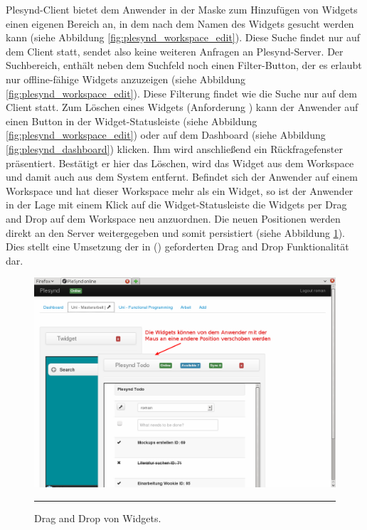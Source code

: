 Plesynd-Client bietet dem Anwender in der Maske zum Hinzufügen von Widgets einen eigenen Bereich an, in dem nach dem Namen des Widgets gesucht werden kann (siehe Abbildung \ref{fig:plesynd_workspace_edit}). Diese Suche findet nur auf dem Client statt, sendet also keine weiteren Anfragen an Plesynd-Server. Der Suchbereich, enthält neben dem Suchfeld noch einen Filter-Button, der es erlaubt nur offline-fähige Widgets anzuzeigen (siehe Abbildung \ref{fig:plesynd_workspace_edit}). Diese Filterung findet wie die Suche nur auf dem Client statt. Zum Löschen eines Widgets (Anforderung  \emph{\requirementWidgetDelete}) kann der Anwender auf einen Button in der Widget-Statusleiste (siehe Abbildung \ref{fig:plesynd_workspace_edit}) oder auf dem Dashboard (siehe Abbildung \ref{fig:plesynd_dashboard}) klicken. Ihm wird anschließend ein Rückfragefenster präsentiert. Bestätigt er hier das Löschen, wird das Widget aus dem Workspace und damit auch aus dem System entfernt. Befindet sich der Anwender auf einem Workspace und hat dieser Workspace mehr als ein Widget, so ist der Anwender in der Lage mit einem Klick auf die Widget-Statusleiste die Widgets per Drag and Drop auf dem Workspace neu anzuordnen. Die neuen Positionen werden direkt an den Server weitergegeben und somit persistiert (siehe Abbildung \ref{fig:plesynd_drag_and_drop}). Dies stellt eine Umsetzung der in  (\emph{\requirementWidgetSortDragNDrop}) geforderten Drag and Drop Funktionalität dar. 
\begin{figure}[H]
  \centering
  \includegraphics[width=\textwidth]{./Figures/plesynd_drag_and_drop.png}
    \rule{35em}{0.5pt}
  \caption[Plesynd User"=Interface: Drag and Drop von Widgets]{Drag and Drop von Widgets.}
  \label{fig:plesynd_drag_and_drop}
\end{figure}

